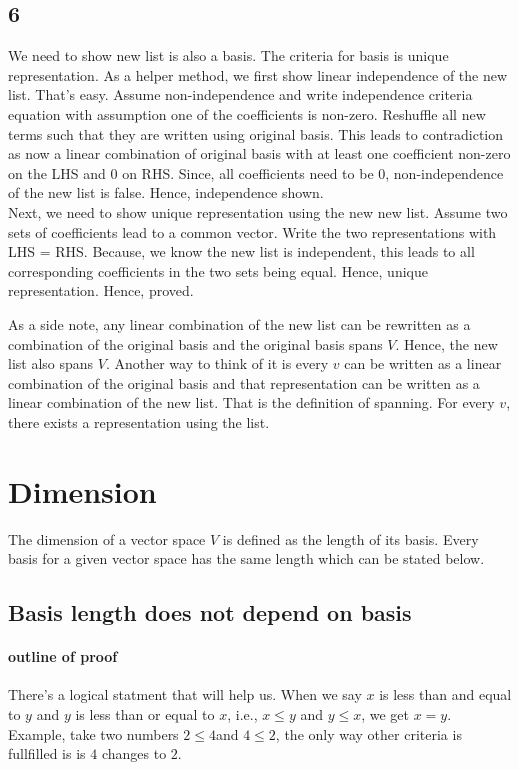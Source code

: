 \documentclass{report}
\begin{document}
\subsection*{6}
We need to show new list is also a basis. The criteria for basis is unique representation. As a helper method, we first show linear independence of the new list. That's easy. Assume non-independence and write independence criteria equation with assumption one of the coefficients is non-zero. Reshuffle all new terms such that they are written using original basis. This leads to contradiction as now a linear combination of original basis with at least one coefficient non-zero on the LHS and 0 on RHS. Since, all coefficients need to be 0, non-independence of the new list is false. Hence, independence shown.\\
Next, we need to show unique representation using the new new list. Assume two sets of coefficients lead to a common vector. Write the two representations with LHS = RHS. Because, we know the new list is independent, this leads to all corresponding coefficients in the two sets being equal. Hence, unique representation. Hence, proved. 

As a side note, any linear combination of the new list can be rewritten as a combination of the original basis and the original basis spans $V$. Hence, the new list also spans $V$. Another way to think of it is every $v$ can be written as a linear combination of the original basis and that representation can be written as a linear combination of the new list. That is the definition of spanning. For every $v$, there exists a representation using the list.


\section{Dimension}
The dimension of a vector space $V$ is defined as the length of its basis. Every basis for a given vector space has the same length which can be stated below. 

\subsection{Basis length does not depend on basis}

\paragraph{outline of proof}

There's a logical statment that will help us. When we say $x$ is less than and equal to $y$ and $y$ is less than or equal to $x$, i.e., $x \leq y$ and $y \leq x$, we get $x=y$. Example, take two numbers $2 \leq 4$and $4 \leq 2$, the only way other criteria is fullfilled is is $4$ changes to $2 $. 
\end{document}
